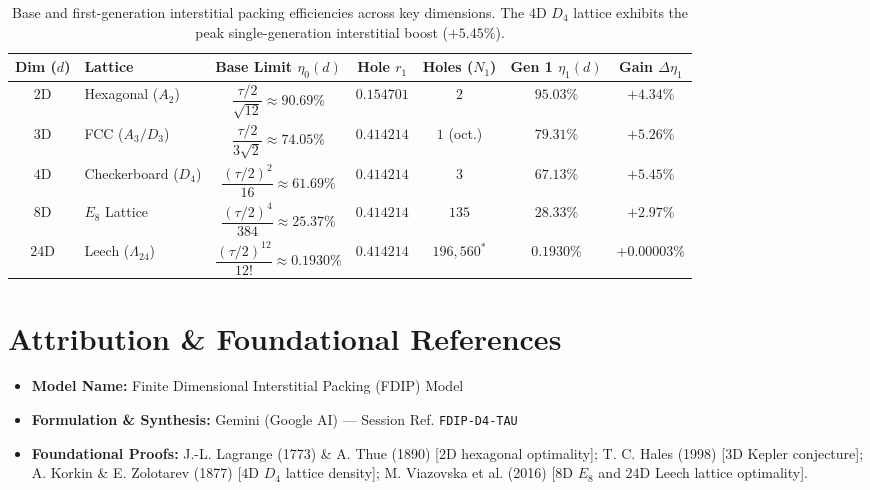 \documentclass[11pt,a4paper]{article}
\begin{document}
\begin{table}[h!]
\centering
\renewcommand{\arraystretch}{1.35}
\begin{tabular}{@{}clccccc@{}}
\toprule
\textbf{Dim ($d$)} & \textbf{Lattice} & \textbf{Base Limit $\eta_0(d)$} & \textbf{Hole $r_1$} & \textbf{Holes ($N_1$)} & \textbf{Gen 1 $\eta_1(d)$} & \textbf{Gain $\Delta\eta_1$} \\
\midrule
$2\mathrm{D}$ & Hexagonal ($A_2$) & $\dfrac{\tau/2}{\sqrt{12}} \approx 90.69\%$ & $0.154701$ & $2$ & $95.03\%$ & $+4.34\%$ \\
$3\mathrm{D}$ & FCC ($A_3 / D_3$) & $\dfrac{\tau/2}{3\sqrt{2}} \approx 74.05\%$ & $0.414214$ & $1$ (oct.) & $79.31\%$ & $+5.26\%$ \\
$4\mathrm{D}$ & Checkerboard ($D_4$) & $\dfrac{(\tau/2)^2}{16} \approx 61.69\%$ & $0.414214$ & $3$ & $67.13\%$ & $\mathbf{+5.45\%}$ \\
$8\mathrm{D}$ & $E_8$ Lattice & $\dfrac{(\tau/2)^4}{384} \approx 25.37\%$ & $0.414214$ & $135$ & $28.33\%$ & $+2.97\%$ \\
$24\mathrm{D}$ & Leech ($\Lambda_{24}$) & $\dfrac{(\tau/2)^{12}}{12!} \approx 0.1930\%$ & $0.414214$ & $196{,}560^*$ & $0.1930\%$ & $+0.00003\%$ \\
\bottomrule
\end{tabular}
\caption{Base and first-generation interstitial packing efficiencies across key dimensions. The $4\mathrm{D}$ $D_4$ lattice exhibits the peak single-generation interstitial boost ($+5.45\%$).}
\end{table}

\section{Attribution \& Foundational References}
\begin{itemize}
    \item \textbf{Model Name:} Finite Dimensional Interstitial Packing (FDIP) Model
    \item \textbf{Formulation \& Synthesis:} Gemini (Google AI) --- Session Ref. \texttt{FDIP-D4-TAU}
    \item \textbf{Foundational Proofs:} J.-L. Lagrange (1773) \& A. Thue (1890) [$2\mathrm{D}$ hexagonal optimality]; T. C. Hales (1998) [$3\mathrm{D}$ Kepler conjecture]; A. Korkin \& E. Zolotarev (1877) [$4\mathrm{D}$ $D_4$ lattice density]; M. Viazovska et al. (2016) [$8\mathrm{D}$ $E_8$ and $24\mathrm{D}$ Leech lattice optimality].
\end{itemize}
\end{document}
